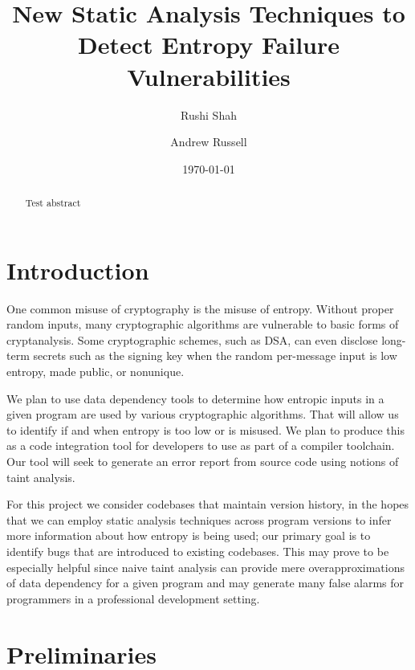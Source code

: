 \documentclass[letterpaper,twocolumn,10pt]{article}
\begin{document}
\date{\today}

\title{\Large \bf New Static Analysis Techniques to Detect Entropy Failure Vulnerabilities}

\author{
{\rm Rushi Shah}
\and
{\rm Andrew Russell}
}

\maketitle

\begin{abstract}
 Test abstract
\end{abstract}

\section{Introduction}

One common misuse of cryptography is the misuse of entropy. Without proper random inputs, many cryptographic algorithms
are vulnerable to basic forms of cryptanalysis. Some cryptographic schemes, such as DSA, can even disclose long-term secrets
such as the signing key when the random per-message input is low entropy, made public, or nonunique.

We plan to use data dependency tools to determine how entropic inputs in a given program are used by various cryptographic algorithms. That will allow us to identify if and when entropy is too low or is misused. We plan to produce this as a code integration tool for developers to use as part of a compiler toolchain.
Our tool will seek to generate an error report from source code using notions of taint analysis. 

For this project we consider codebases that maintain version history, in the hopes that we can employ static analysis techniques across program versions to infer more information about how entropy is being used; 
our primary goal is to identify bugs that are introduced to existing codebases. This may prove to be especially helpful since naive taint analysis can provide mere overapproximations of data dependency for a given program and may generate many false alarms for programmers in a professional development setting.

\section{Preliminaries}
\end{document}

